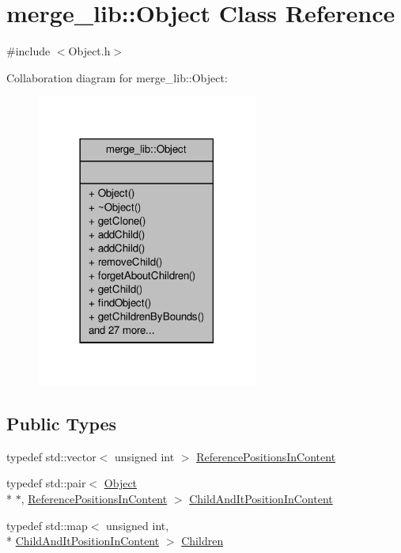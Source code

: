 \hypertarget{classmerge__lib_1_1_object}{\section{merge\-\_\-lib\-:\-:Object Class Reference}
\label{d7/df1/classmerge__lib_1_1_object}
}


{\ttfamily \#include $<$Object.\-h$>$}



Collaboration diagram for merge\-\_\-lib\-:\-:Object\-:
\nopagebreak
\begin{figure}[H]
\begin{center}
\leavevmode
\includegraphics[width=206pt]{d4/d67/classmerge__lib_1_1_object__coll__graph}
\end{center}
\end{figure}
\subsection*{Public Types}
\begin{DoxyCompactItemize}
\item 
typedef std\-::vector$<$ unsigned int $>$ \hyperlink{classmerge__lib_1_1_object_aa3326883ea53ef2e2a33e2b81a7cc98c}{Reference\-Positions\-In\-Content}
\item 
typedef std\-::pair$<$ \hyperlink{classmerge__lib_1_1_object}{Object} \\*
$\ast$, \hyperlink{classmerge__lib_1_1_object_aa3326883ea53ef2e2a33e2b81a7cc98c}{Reference\-Positions\-In\-Content} $>$ \hyperlink{classmerge__lib_1_1_object_a61ce4ed189bafe56ea358abdeb25ad54}{Child\-And\-It\-Position\-In\-Content}
\item 
typedef std\-::map$<$ unsigned int, \\*
\hyperlink{classmerge__lib_1_1_object_a61ce4ed189bafe56ea358abdeb25ad54}{Child\-And\-It\-Position\-In\-Content} $>$ \hyperlink{classmerge__lib_1_1_object_a4e1f3bf43d9fc39fea3829f7ae1da4a8}{Children}
\end{DoxyCompactItemize}
